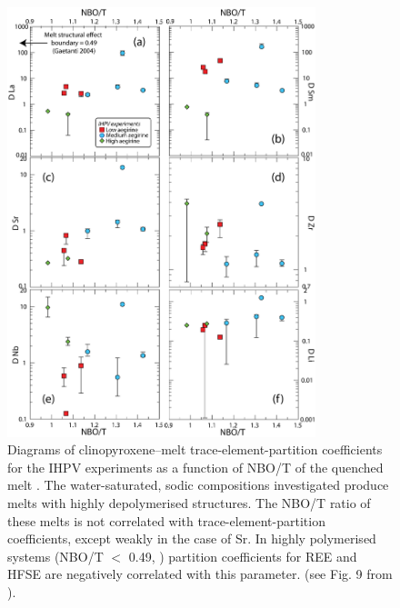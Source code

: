 \documentclass[review,authoryear,12pt]{elsarticle}
\begin{document}
\begin{figure}[tbp]
        \begin{center}
        \includegraphics[width=0.8\textwidth]{11_NBO-T_Traces.eps}
        \caption[]{Diagrams of clinopyroxene--melt trace-element-partition coefficients for the IHPV experiments as a function of NBO/T of the quenched melt \citep{Mysen1985}. The water-saturated, sodic compositions investigated produce melts with highly depolymerised structures. The NBO/T ratio of these melts is not correlated with trace-element-partition coefficients, except weakly in the case of Sr. In highly polymerised systems (NBO/T $<$ 0.49, \citealt{Gaetani2004}) partition coefficients for REE and HFSE are negatively correlated with this parameter. (see Fig. 9 from \citealt{Huang2006}).}
        \label{10_1_MeltStructure}
        \end{center}
        \end{figure}
\end{document}
